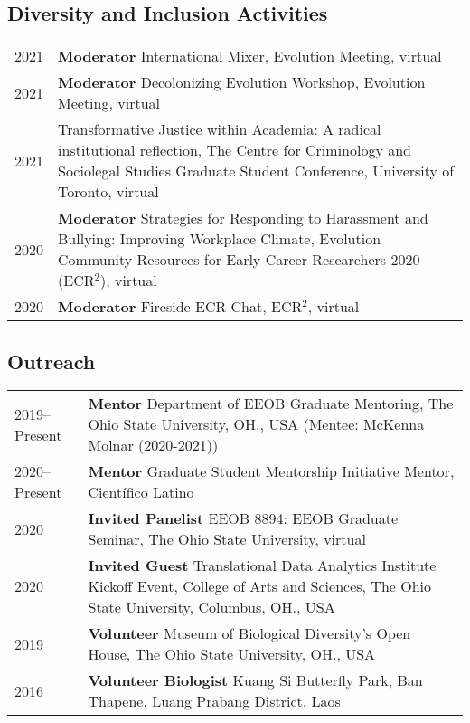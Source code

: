 \documentclass[11pt]{article}
\begin{document}
\subsection*{Diversity and Inclusion Activities}
\begin{longtable}{p{}  p{}}
2021& \textbf{Moderator} International Mixer, Evolution Meeting, virtual\\
2021& \textbf{Moderator} Decolonizing Evolution Workshop, Evolution Meeting, virtual\\
2021 & Transformative Justice within Academia: A radical institutional reflection, The Centre for Criminology and Sociolegal Studies Graduate Student Conference, University of Toronto, virtual\\
2020 &	\textbf{Moderator} Strategies for Responding to Harassment and Bullying: Improving Workplace Climate, Evolution Community Resources for Early Career Researchers 2020 (ECR$^2$), virtual\\
2020 &	\textbf{Moderator} Fireside ECR Chat, ECR$^2$, virtual\\
\end{longtable}


\subsection*{Outreach}
\begin{longtable}{p{}  p{}}
2019--Present & \textbf{Mentor} Department of EEOB Graduate Mentoring, The Ohio State University, OH., USA (Mentee: McKenna Molnar (2020-2021))\\
2020--Present& \textbf{Mentor} Graduate Student Mentorship Initiative Mentor, Científico Latino\\
2020 &	\textbf{Invited Panelist} EEOB 8894: EEOB Graduate Seminar, The Ohio State University, virtual\\
2020 &	\textbf{Invited Guest} Translational Data Analytics Institute Kickoff Event, College of Arts and Sciences, The Ohio State University, Columbus, OH., USA\\
2019 & \textbf{Volunteer} Museum of Biological Diversity’s Open House, The Ohio State University, OH., USA\\
2016 &  \textbf{Volunteer Biologist} Kuang Si Butterfly Park, Ban Thapene, Luang Prabang District, Laos\vspace{5pt}\\
\end{longtable}
\end{document}
